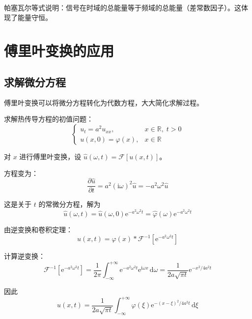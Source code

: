 \begin{wulibj}[物理意义]
帕塞瓦尔等式说明：信号在时域的总能量等于频域的总能量（差常数因子）。这体现了能量守恒。
\end{wulibj}

\section{傅里叶变换的应用}

\subsection{求解微分方程}

傅里叶变换可以将微分方程转化为代数方程，大大简化求解过程。

\begin{lizi}{}{}
求解热传导方程的初值问题：
\begin{equation}
    \begin{cases}
        u_t = a^2 u_{xx}, & x \in \mathbb{R}, \; t > 0 \\
        u(x, 0) = \varphi(x), & x \in \mathbb{R}
    \end{cases}
\end{equation}

\begin{jie}
    对 $x$ 进行傅里叶变换，设 $\hat{u}(\omega, t) = \mathcal{F}[u(x, t)]$。
    
    方程变为：
    \begin{equation}
        \frac{\partial\hat{u}}{\partial t} = a^2(\mathrm{i}\omega)^2\hat{u} = -a^2\omega^2\hat{u}
    \end{equation}
    
    这是关于 $t$ 的常微分方程，解为
    \begin{equation}
        \hat{u}(\omega, t) = \hat{u}(\omega, 0)\mathrm{e}^{-a^2\omega^2 t} = \hat{\varphi}(\omega)\mathrm{e}^{-a^2\omega^2 t}
    \end{equation}
    
    由逆变换和卷积定理：
    \begin{equation}
        u(x, t) = \varphi(x) * \mathcal{F}^{-1}[\mathrm{e}^{-a^2\omega^2 t}]
    \end{equation}
    
    计算逆变换：
    \begin{equation}
        \mathcal{F}^{-1}[\mathrm{e}^{-a^2\omega^2 t}] = \frac{1}{2\pi}\int_{-\infty}^{+\infty} \mathrm{e}^{-a^2\omega^2 t}\mathrm{e}^{\mathrm{i}\omega x}\,\mathrm{d}\omega = \frac{1}{2a\sqrt{\pi t}}\mathrm{e}^{-x^2/4a^2 t}
    \end{equation}
    
    因此
    \begin{equation}
        \boxed{u(x, t) = \frac{1}{2a\sqrt{\pi t}}\int_{-\infty}^{+\infty} \varphi(\xi)\mathrm{e}^{-(x-\xi)^2/4a^2 t}\,\mathrm{d}\xi}
    \end{equation}
\end{jie}
\end{lizi}

